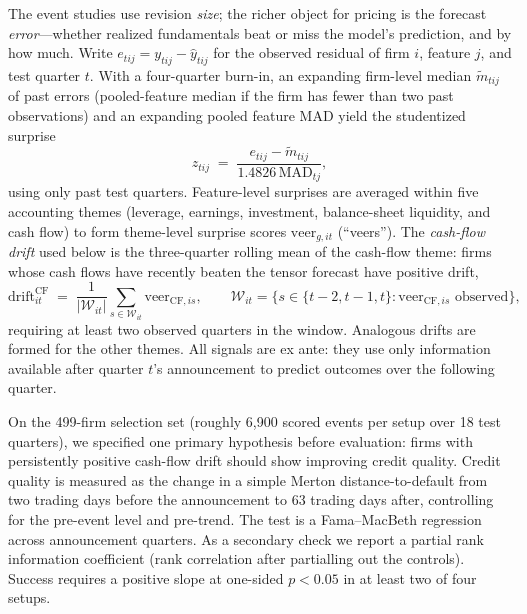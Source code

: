 \documentclass[pdflatex,sn-mathphys-num]{sn-jnl}%
\theoremstyle{thmstyleone}%
\theoremstyle{thmstyletwo}%
\theoremstyle{thmstylethree}%
\begin{document}
The event studies use revision \emph{size}; the richer object for pricing is the forecast \emph{error}---whether realized fundamentals beat or miss the model's prediction, and by how much. Write $e_{tij}=y_{tij}-\hat{y}_{tij}$ for the observed residual of firm $i$, feature $j$, and test quarter $t$. With a four-quarter burn-in, an expanding firm-level median $\tilde{m}_{tij}$ of past errors (pooled-feature median if the firm has fewer than two past observations) and an expanding pooled feature MAD yield the studentized surprise
\begin{equation}
\label{Eq:VeerZ}
z_{tij} \;=\; \frac{e_{tij}-\tilde{m}_{tij}}{1.4826\,\mathrm{MAD}_{tj}},
\end{equation}
using only past test quarters. Feature-level surprises are averaged within five accounting themes (leverage, earnings, investment, balance-sheet liquidity, and cash flow) to form theme-level surprise scores $\mathrm{veer}_{g,it}$ (``veers''). The \emph{cash-flow drift} used below is the three-quarter rolling mean of the cash-flow theme: firms whose cash flows have recently beaten the tensor forecast have positive drift,
\begin{equation}
\label{Eq:CashflowDrift}
\mathrm{drift}^{\mathrm{CF}}_{it} \;=\; \frac{1}{|\mathcal{W}_{it}|}\sum_{s\in\mathcal{W}_{it}} \mathrm{veer}_{\mathrm{CF},is},
\qquad
\mathcal{W}_{it}=\{s\in\{t-2,t-1,t\}:\mathrm{veer}_{\mathrm{CF},is}\text{ observed}\},
\end{equation}
requiring at least two observed quarters in the window. Analogous drifts are formed for the other themes. All signals are ex ante: they use only information available after quarter $t$'s announcement to predict outcomes over the following quarter.

On the 499-firm selection set (roughly 6{,}900 scored events per setup over 18 test quarters), we specified one primary hypothesis before evaluation: firms with persistently positive cash-flow drift should show improving credit quality. Credit quality is measured as the change in a simple Merton distance-to-default \citep{bharath2008forecasting} from two trading days before the announcement to 63 trading days after, controlling for the pre-event level and pre-trend. The test is a Fama--MacBeth regression \citep{fama1973risk} across announcement quarters. As a secondary check we report a partial rank information coefficient (rank correlation after partialling out the controls). Success requires a positive slope at one-sided $p<0.05$ in at least two of four setups.
\end{document}
